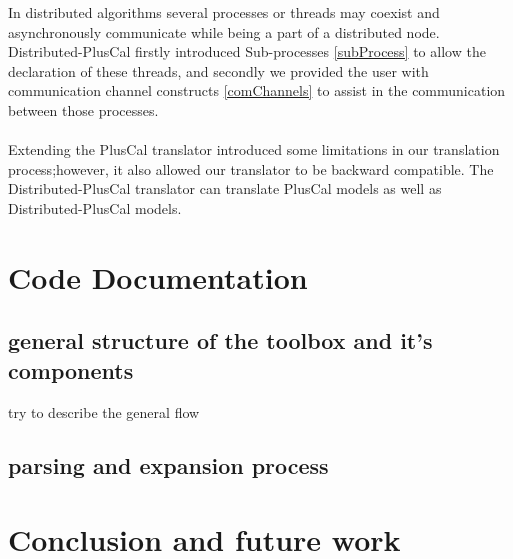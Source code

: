 \documentclass{thesul}
\begin{document}
In distributed algorithms several processes or threads may coexist and asynchronously communicate while being a part of a distributed node. Distributed-PlusCal firstly introduced Sub-processes \ref{subProcess} to allow the declaration of these threads, and secondly we provided the user with communication channel constructs \ref{comChannels} to assist in the communication between those processes.
\\\\
Extending the PlusCal translator introduced some limitations in our translation process;however, it also allowed our translator to be backward compatible. The Distributed-PlusCal translator can translate PlusCal models as well as Distributed-PlusCal models.

\chapter{Code Documentation}

\section{general structure of the toolbox and it's components}
try to describe the general flow

\section{parsing and expansion process}


\chapter{Conclusion and future work}
\end{document}
